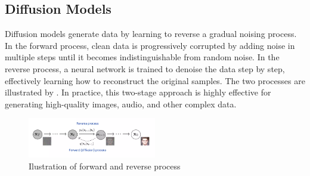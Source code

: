 \documentclass[a4paper,10pt]{article}
\theoremstyle{definition} %
\theoremstyle{definition} %
\theoremstyle{definition} %
\theoremstyle{definition} %
\newcommand{\0}{\boldsymbol{0}}
\begin{document}
\subsection{Diffusion Models}
Diffusion models generate data by learning to reverse a gradual noising process. In the forward process, clean data is progressively corrupted by adding noise in multiple steps until it becomes indistinguishable from random noise. In the reverse process, a neural network is trained to denoise the data step by step, effectively learning how to reconstruct the original samples. The two processes are illustrated by . In practice, this two-stage approach is highly effective for generating high-quality images, audio, and other complex data.
\begin{figure}[h] %
    \centering
    \includegraphics[width=0.5\textwidth]{../images/Diffusion_model.png} %
    \caption{Ilustration of forward and reverse process \cite{slideshare2025}}
    \label{fig:Diffusion_model}
\end{figure}
\end{document}
